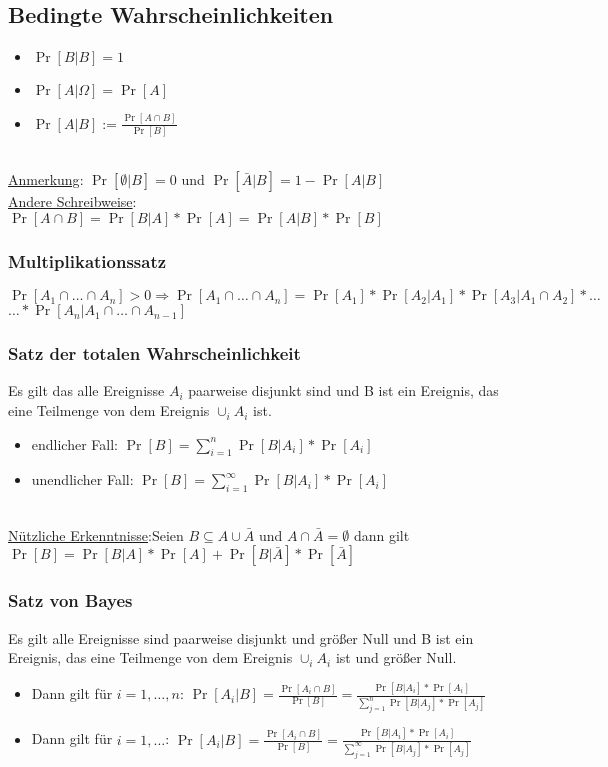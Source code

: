 \subsection{Bedingte Wahrscheinlichkeiten}
\begin{itemize}
\item $\Pr[B|B]=1$
\item $\Pr[A|\Omega]=\Pr[A]$
\item $\Pr[A|B]:=\frac{\Pr[A\cap B]}{\Pr[B]}$
\end{itemize}
\\
\underline{Anmerkung}: $\Pr[\emptyset | B]= 0$ und $\Pr[\bar A|B]=1-\Pr[A|B]$\\
\underline{Andere Schreibweise}: $\Pr[A\cap B]=\Pr[B|A]*\Pr[A]= \Pr[A|B]*\Pr[B]$

\subsubsection{Multiplikationssatz}
$\Pr[A_1\cap\ldots\cap A_n]>0\Rightarrow\Pr[A_1\cap\ldots\cap A_n]=\Pr[A_1]*\Pr[A_2|A_1]*\Pr[A_3|A_1\cap A_2]*\ldots$\\
$\dots*\Pr[A_n|A_1\cap\ldots\cap A_{n-1}]$

\subsubsection{Satz der totalen Wahrscheinlichkeit}
Es gilt das alle Ereignisse $A_i$ paarweise disjunkt sind und B ist ein Ereignis, das eine Teilmenge von dem Ereignis $\cup_i A_i$ ist.
\begin{itemize}
\item endlicher Fall: $\Pr[B]=\sum_{i=1}^n\Pr[B|A_i]*\Pr[A_i]$
\item unendlicher Fall: $\Pr[B]=\sum_{i=1}^\infty\Pr[B|A_i]*\Pr[A_i]$
\end{itemize}
\\
\underline{Nützliche Erkenntnisse}:Seien $B\subseteq A\cup\bar A$ und $A\cap\bar A =\emptyset$ dann gilt $\Pr[B]=\Pr[B|A]*\Pr[A]+\Pr[B|\bar A]*\Pr[\bar A]$

\subsubsection{Satz von Bayes}
Es gilt alle Ereignisse sind paarweise disjunkt und größer Null und B ist ein Ereignis, das eine Teilmenge von dem Ereignis $\cup_i A_i$ ist und größer Null.
\begin{itemize}
\item Dann gilt für $i=1,\ldots,n$: $\Pr[A_i|B]=\frac{\Pr[A_i\cap B]}{\Pr[B]}=\frac{\Pr[B|A_i]*\Pr[A_i]}{\sum^n_{j=1}\Pr[B|A_j]*\Pr[A_j]}$
\item Dann gilt für $i=1,\ldots$: $\Pr[A_i|B]=\frac{\Pr[A_i\cap B]}{\Pr[B]}=\frac{\Pr[B|A_i]*\Pr[A_i]}{\sum^\infty_{j=1}\Pr[B|A_j]*\Pr[A_j]}$
\end{itemize}

